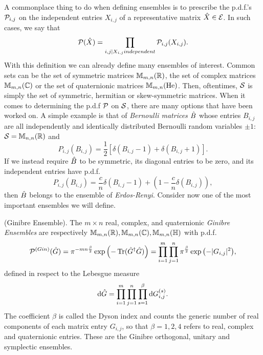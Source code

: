 A commonplace thing to do when defining ensembles is to prescribe the p.d.f.'s $\mathcal{P}_{i,j}$ on the independent entries $X_{i,j}$ of a representative matrix $\hat X \in \mathcal{E}$. In such cases, we say that
\begin{equation}
	\mathcal{P}(\hat X) = \prod_{i,j | X_{i,j} independent} \mathcal{P}_{i,j}(X_{i,j}).
\end{equation}
With this definition we can already define many ensembles of interest. Common sets can be the set of symmetric matrices $\mathbb{M}_{m,n}(\mathbb{R})$, the set of complex matrices $\mathbb{M}_{m,n}(\mathbb{C})$ or the set of quaternionic matrices $\mathbb{M}_{m,n}(\mathrm{He})$. Then, oftentimes, $\mathcal{S}$ is simply the set of symmetric, hermitian or skew-symmetric matrices. When it comes to determining the p.d.f $\mathcal{P}$ on $\mathcal{S}$, there are many options that have been worked on. A simple example is that of \textit{Bernoulli matrices} $\hat B$ whose entries $B_{i,j}$ are all independently and identically distributed Bernoulli random variables $\pm 1$: $\mathcal{S}=\mathbb{M}_{n,n}(\mathbb{R})$ and $$P_{i,j}(B_{i,j}) = \frac{1}{2} \left[ \delta(B_{i,j}-1) + \delta(B_{i,j}+1)\right].$$ If we instead require $\hat B$ to be symmetric, its diagonal entries to be zero, and its independent entries have p.d.f. $$P_{i,j}(B_{i,j}) = \frac{c}{n} \delta(B_{i,j}-1) + \left(1 - \frac{c}{n} \delta\left(B_{i,j}\right)\right),$$ then $\hat B$ belongs to the ensemble of \textit{Erdos-Renyi}. Consider now one of the most important ensembles we will define.

\begin{definition}
	(Ginibre Ensemble). The $m \times n$ real, complex, and quaternionic \textit{Ginibre Ensembles} are respectively $\mathbb{M}_{m,n}(\mathbb{R}), \mathbb{M}_{m,n}(\mathbb{C}), \mathbb{M}_{m,n}(\mathbb{H})$ with p.d.f.
	\begin{equation}
		\mathcal{P}^{(Gin)}(\hat G) = \pi^{-mn\frac{\beta}{2}} \exp{\left( -\operatorname{Tr}(\hat G^{\dagger}\hat G)\right)} = \prod_{i=1}^{m} \prod_{j=1}^{n} \pi^{\frac{\beta}{2}} \exp{\left(-|G_{i,j}|^2 \right)},
	\end{equation}
	defined in respect to the Lebesgue measure
	\begin{equation}
		\mathrm{d} \hat G = \prod_{i=1}^{m} \prod_{j=1}^{n} \prod_{s=1}^\beta \mathrm{d} G_{i,j}^{(s)}.
	\end{equation}
	The coefficient $\beta$ is called the Dyson index and counts the generic number of real components of each matrix entry $G_{i,j}$, so that $\beta=1,2,4$ refers to real, complex and quaternionic entries. These are the Ginibre orthogonal, unitary and symplectic ensembles.
	\label{Def: Ginibre}
\end{definition}

